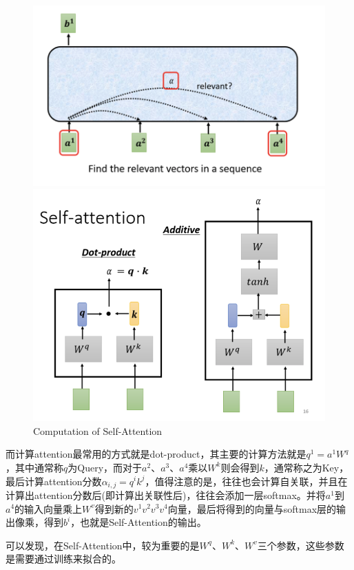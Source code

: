 \documentclass{article}
\begin{document}
\begin{figure}[H]
	\begin{minipage}[t]{0.5\linewidth}
		\centering
		\includegraphics[scale=0.4]{picture/SelfAttention2.png}
	\end{minipage}
    \quad
	\begin{minipage}[t]{0.5\linewidth}
		\centering
		\includegraphics[scale=0.4]{picture/SelfAttention3.png}
	\end{minipage}
	\caption{Computation of Self-Attention}
	\label{fig:galxy}
\end{figure}

\indent 而计算attention最常用的方式就是dot-product，其主要的计算方法就是\(q^{1} = a^{1}W^{q} \)，其中通常称\(q\)为Query，而对于\(a^{2}、a^{3}、a^{4}\)乘以\(W^{k}\)则会得到\(k\)，通常称之为Key，最后计算attention分数\(\alpha_{i,j}=q^{i}k^{j}\)，值得注意的是，往往也会计算自关联，并且在计算出attention分数后(即计算出关联性后)，往往会添加一层softmax。并将\(a^{1}\)到\(a^{4}\)的输入向量乘上\(W^{v}\)得到新的\(v^{1}v^{2}v^{3}v^{4}\)向量，最后将得到的向量与softmax层的输出像乘，得到\(b^{i}\)，也就是Self-Attention的输出。 \par
\indent 可以发现，在Self-Attention中，较为重要的是\(W^{q}、W^{k}、W^{v}\)三个参数，这些参数是需要通过训练来拟合的。 \par
\end{document}
